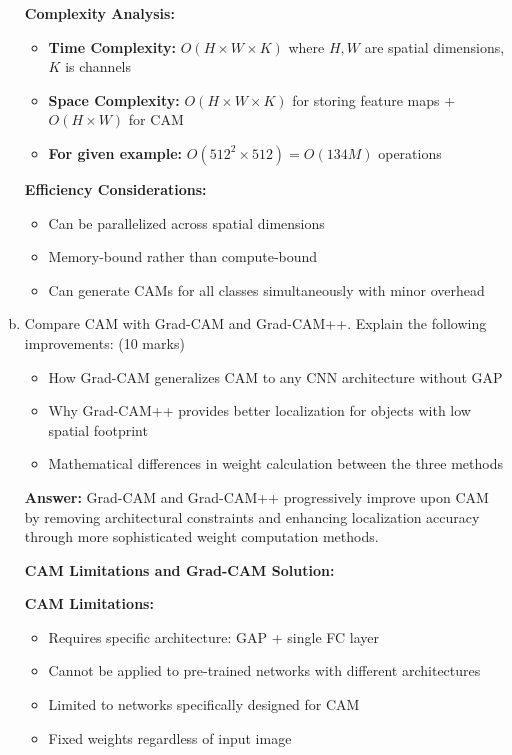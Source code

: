 \documentclass[12pt]{article}
\newcommand{\answer}[1]{{\color{answercolor}\textbf{Answer:} #1}}
\newcommand{\explanation}[1]{{\color{explanationcolor}#1}}
\begin{document}
\begin{enumerate}[(a)]
{    \textbf{Complexity Analysis:}
    \begin{itemize}
        \item \textbf{Time Complexity:} $O(H \times W \times K)$ where $H, W$ are spatial dimensions, $K$ is channels
        \item \textbf{Space Complexity:} $O(H \times W \times K)$ for storing feature maps + $O(H \times W)$ for CAM
        \item \textbf{For given example:} $O(512^2 \times 512) = O(134M)$ operations
    \end{itemize}
    
    \textbf{Efficiency Considerations:}
    \begin{itemize}
        \item Can be parallelized across spatial dimensions
        \item Memory-bound rather than compute-bound
        \item Can generate CAMs for all classes simultaneously with minor overhead
    \end{itemize}
    }
    
    \item Compare CAM with Grad-CAM and Grad-CAM++. Explain the following improvements: \hfill (10 marks)
    \begin{itemize}
        \item How Grad-CAM generalizes CAM to any CNN architecture without GAP
        \item Why Grad-CAM++ provides better localization for objects with low spatial footprint
        \item Mathematical differences in weight calculation between the three methods
    \end{itemize}
    
    \answer{Grad-CAM and Grad-CAM++ progressively improve upon CAM by removing architectural constraints and enhancing localization accuracy through more sophisticated weight computation methods.}
    
    \explanation{
    \textbf{CAM Limitations and Grad-CAM Solution:}
    
    \textbf{CAM Limitations:}
    \begin{itemize}
        \item Requires specific architecture: GAP + single FC layer
        \item Cannot be applied to pre-trained networks with different architectures
        \item Limited to networks specifically designed for CAM
        \item Fixed weights regardless of input image
    \end{itemize}
    
}
\end{enumerate}
\end{document}
